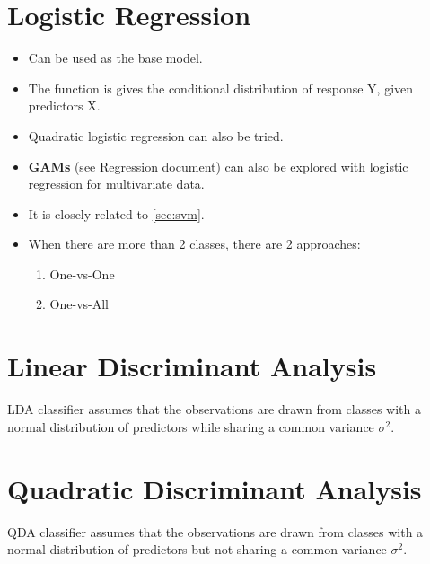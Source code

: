 \documentclass[a4paper, 12pt]{report}
\begin{document}

\section{Logistic Regression}
\label{sec:logreg}
\begin{itemize}
\item Can be used as the base model.
\item The function is gives the conditional distribution of response Y, given predictors X.
\item Quadratic logistic regression can also be tried.
\item \textbf{GAMs} (see Regression document) can also be explored with logistic regression for multivariate data.
\item It is closely related to  \autoref{sec:svm}.
\item When there are more than 2 classes, there are 2 approaches:
\begin{enumerate}
\item One-vs-One
\item One-vs-All
\end{enumerate}

\end{itemize}

\section{Linear Discriminant Analysis}
LDA classifier assumes that the observations are drawn from classes with a normal distribution of predictors while sharing a common variance $\sigma^2$.

\section{Quadratic Discriminant Analysis}
QDA classifier assumes that the observations are drawn from classes with a normal distribution of predictors but not sharing a common variance $\sigma^2$.

\end{document}
